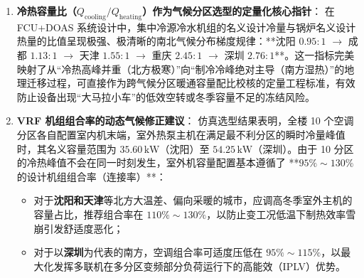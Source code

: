 \documentclass[11pt,a4paper]{article}
\begin{document}
\begin{enumerate}
    \item \textbf{冷热容量比（$Q_{\mathrm{cooling}}/Q_{\mathrm{heating}}$）作为气候分区选型的定量化核心指针}：
    在 FCU+DOAS 系统设计中，集中冷源冷水机组的名义设计冷量与锅炉名义设计热量的比值呈现极强、极清晰的南北气候分布梯度规律：**沈阳 $0.95:1$ $\to$ 成都 $1.13:1$ $\to$ 天津 $1.55:1$ $\to$ 重庆 $2.45:1$ $\to$ 深圳 $2.76:1$**。这一指标完美映射了从“冷热高峰并重（北方极寒）”向“制冷冷峰绝对主导（南方湿热）”的地理迁移过程，可直接作为跨气候分区暖通容量配比校核的定量工程标准，有效防止设备出现“大马拉小车”的低效空转或冬季容量不足的冻结风险。
    
    \item \textbf{VRF 机组组合率的动态气候修正建议}：
    仿真选型结果表明，全楼 10 个空调分区各自配置室内机末端，室外热泵主机在满足最不利分区的瞬时冷量峰值时，其名义容量范围为 $35.60\,\mathrm{kW}$（沈阳）至 $54.25\,\mathrm{kW}$（深圳）。由于 10 分区的冷热峰值不会在同一时刻发生，室外机容量配置基本遵循了 **$95\% \sim 130\%$ 的设计机组组合率（连接率）**：
    \begin{itemize}
        \item 对于\textbf{沈阳和天津}等北方大温差、偏向采暖的城市，应调高冬季室外主机的容量占比，推荐组合率在 $110\% \sim 130\%$，以防止变工况低温下制热效率雪崩引发舒适度恶化；
        \item 对于以\textbf{深圳}为代表的南方，空调组合率可适度压低在 $95\% \sim 115\%$，以最大化发挥多联机在多分区变频部分负荷运行下的高能效（IPLV）优势。
    \end{itemize}
\end{enumerate}
\end{document}

